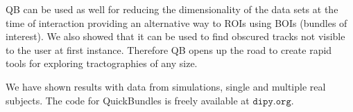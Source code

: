 \documentclass{bioinfo}
\begin{document}
QB can be used as well for reducing the dimensionality of the data sets
at the time of interaction providing an alternative way to ROIs using
BOIs (bundles of interest). We also showed
that it can be used to find obscured tracks not visible to the user
at first instance. Therefore QB opens up the road to create rapid
tools for exploring tractographies of any size.

We have shown results with data from simulations, single and
multiple real subjects. The code for QuickBundles is freely available at
$\texttt{dipy.org}$.






\end{document}
